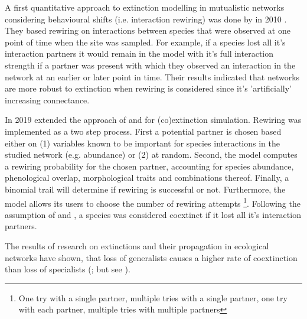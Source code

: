 \documentclass[12pt,a4paper]{article}
\begin{document}
A first quantitative approach to extinction modelling in mutualistic networks considering behavioural shifts (i.e. interaction rewiring) was done by \citeauthor{Kaiser-Bunbury2010} in 2010 \parencite{Kaiser-Bunbury2010}. They based rewiring on interactions between species that were observed at one point of time when the site was sampled. For example, if a species lost all it's interaction partners it would remain in the model with it's full interaction strength if a partner was present with which they observed an interaction in the network at an earlier or later point in time. Their results indicated that networks are more robust to extinction when rewiring is considered since it's 'artificially' increasing connectance. \par

In 2019 \citeauthor{Vizentin-Bugoni2019} extended the approach of \citeauthor{Memmott2004} and \citeauthor{Dunne2002} \parencite{Memmott2004, Dunne2002} for (co)extinction simulation.
Rewiring was implemented as a two step process. First a potential partner is chosen based either on (1) variables known to be important for species interactions in the studied network (e.g. abundance) or (2) at random. Second, the model computes a rewiring probability for the chosen partner, accounting for species abundance, phenological overlap, morphological traits and combinations thereof. Finally, a binomial trail will determine if rewiring is successful or not. Furthermore, the model allows its users to choose the number of rewiring attempts \footnote{
One try with a single partner, 
multiple tries with a single partner, 
one try with each partner, 
multiple tries with multiple partners
}. Following the assumption of \citeauthor{Memmott2004} and \citeauthor{Dunne2002}, a species was considered coextinct if it lost all it's interaction partners.
\par


The results of research on extinctions and their propagation in ecological networks have shown, that loss of generalists causes a higher rate of coextinction than loss of specialists (\cite{Memmott2004, Kaiser-Bunbury2010, Traveset2017, Bastazini2018, Vizentin-Bugoni2019, Biella2020}; but see \cite{Dunne2002}). 

\end{document}
